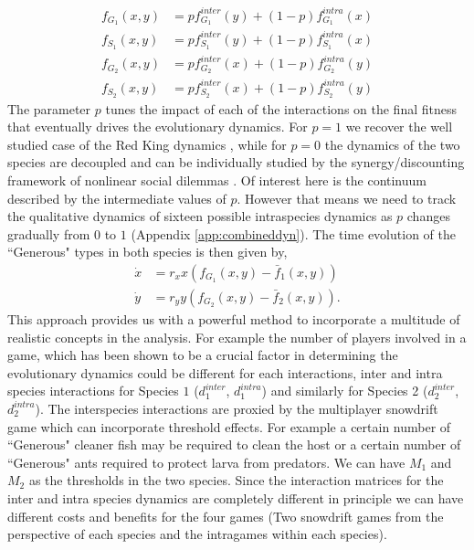 \documentclass[12pt]{article}
\begin{document}
%
\begin{align}
\label{eq:combinedfiteqs}
	f_{G_1} (x,y) &= p f^{inter}_{G_1} (y) + (1-p) f^{intra}_{G_1} (x) \nonumber \\
	f_{S_1} (x,y) &= p f^{inter}_{S_1} (y) + (1-p) f^{intra}_{S_1} (x) \nonumber \\
	f_{G_2} (x,y) &= p f^{inter}_{G_2} (x) + (1-p) f^{intra}_{G_2} (y) \\
	f_{S_2} (x,y) &= p f^{inter}_{S_2} (x) + (1-p) f^{intra}_{S_2} (y) \nonumber
\end{align}
%
The parameter $p$ tunes the impact of each of the interactions on the final fitness that eventually drives the evolutionary dynamics.
For $p=1$ we recover the well studied case of the Red King dynamics \citep{gokhale:PRSB:2012}, while for $p=0$ the dynamics of the two species are  decoupled and can be individually studied by the synergy/discounting framework of nonlinear social dilemmas \citep{hauert:JTB:2006a}.
Of interest here is the continuum described by the intermediate values of $p$.
However that means we need to track the qualitative dynamics of sixteen possible intraspecies dynamics as $p$ changes gradually from $0$ to $1$ (Appendix \ref{app:combineddyn}). 
The time evolution of the ``Generous" types in both species is then given by,
%
\begin{align}
\dot{x} &= r_x x \left(f_{G_1}(x,y) -  \bar{f}_1(x,y) \right) \nonumber \\
\dot{y} &= r_y y \left(f_{G_2}(x,y) -  \bar{f}_2(x,y) \right).
\label{eq:repeq}
\end{align}
%
This approach provides us with a powerful method to incorporate a multitude of realistic concepts in the analysis.
For example the number of players involved in a game, which has been shown to be a crucial factor in determining the evolutionary dynamics could be different for each interactions, inter and intra species interactions for Species $1$ ($d^{inter}_1$, $d^{intra}_1$) and similarly for Species 2 ($d^{inter}_2$, $d^{intra}_2$). 
The interspecies interactions are proxied by the multiplayer snowdrift game which can incorporate threshold effects.
For example a certain number of ``Generous" cleaner fish may be required to clean the host or a certain number of ``Generous" ants required to protect larva from predators.
We can have $M_1$ and $M_2$ as the thresholds in the two species.
Since the interaction matrices for the inter and intra species dynamics are completely different in principle we can have different costs and benefits for the four games (Two snowdrift games from the perspective of each species and the intragames within each species).
\end{document}
